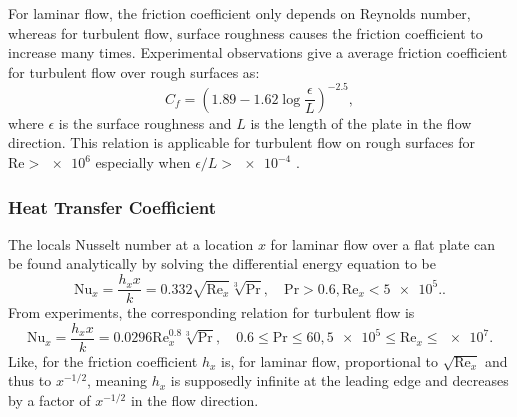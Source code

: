 For laminar flow, the friction coefficient only depends on Reynolds number, whereas for turbulent flow, surface roughness causes the friction coefficient to increase many times.
Experimental observations give a average friction coefficient for turbulent flow over rough surfaces as:
\begin{equation*}
  C_f = \left( \num{1,89} - \num{1,62} \log \frac{\epsilon}{L} \right)^{-\num{2,5}}
,\end{equation*}
where $\epsilon$ is the surface roughness and $L$ is the length of the plate in the flow direction.
This relation is applicable for turbulent flow on rough surfaces for $\mathrm{Re} > \num{e6}$ especially when $\epsilon / L > \num{e-4}$ .

\subsubsection{Heat Transfer Coefficient}
The locals Nusselt number at a location $x$ for laminar flow over a flat plate can be found analytically by solving the differential energy equation to be 
\begin{equation*}
  \mathrm{Nu}_x = \frac{h_x x}{k} = \num{0,332} \sqrt{\mathrm{Re}_x} \sqrt[3]{\mathrm{Pr}}, \quad \mathrm{Pr} > \num{0,6}, \mathrm{Re}_x < \num{5e5}.
.\end{equation*}
From experiments, the corresponding relation for turbulent flow is 
\begin{equation*}
  \mathrm{Nu}_x = \frac{h_x x}{k} = \num{0,0296} \mathrm{Re}_x^{\num{0,8}} \sqrt[3]{\mathrm{Pr}}, \quad \num{0,6} \leq \mathrm{Pr} \leq \num{60}, \num{5e5} \leq \mathrm{Re}_x \leq \num{e7}
.\end{equation*}
Like, for the friction coefficient $h_x$ is, for laminar flow, proportional to $\sqrt{\mathrm{Re}_x}$ and thus to $x^{-1 / 2}$, meaning $h_x$ is supposedly infinite at the leading edge and decreases by a factor of $x^{- 1 / 2}$ in the flow direction.


